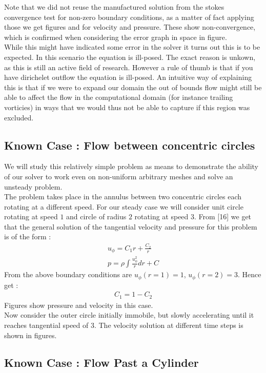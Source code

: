 \documentclass[11pt,twoside,a4paper]{article}
\begin{document}
Note that we did not reuse the manufactured solution from the stokes convergence test for non-zero boundary conditions, as a matter of fact applying those we get figures and  for velocity and pressure. These show non-convergence, which is confirmed when considering the error graph in space in figure.\\
While this might have indicated some error in the solver it turns out this is to be expected. In this scenario the equation is ill-posed. The exact reason is unkown, as this is still an active field of research. However a rule of thumb is that if you have dirichelet outflow the equation is ill-posed. An intuitive way of explaining this is that if we were to expand our domain the out of bounds flow might still be able to affect the flow in the computational domain (for instance trailing vorticies) in ways that we would thus not be able to capture if this region was excluded. 

\subsection{Known Case : Flow between concentric circles}

We will study this relatively simple problem as means to demonstrate the ability of our solver to work even on non-uniform arbitrary meshes and solve an unsteady problem.\\
The problem takes place in the annulus between two concentric circles each rotating at a different speed. For our steady case we will consider unit circle rotating at speed $1$ and circle of radius $2$ rotating at speed $3$. 
From [16] we get that the general solution of the tangential velocity and pressure for this problem is of the form :
\begin{align}
u_{\phi} = C_1 r + \frac{C_2}{r} \\
p = \rho \int \frac{u_{\phi}^2}{r} dr + C
\end{align}
From the above boundary conditions are $u_{\phi}(r=1) = 1$, $u_{\phi}(r=2) = 3$. Hence get :
\begin{align*}
C_1 = 1 - C_2 
\end{align*}
Figures show pressure and velocity in this case.\\

Now consider the outer circle initially immobile, but slowly accelerating until it reaches tangential speed of $3$. The velocity solution at different time steps is shown in figures.

\subsection{Known Case : Flow Past a Cylinder}
\end{document}
